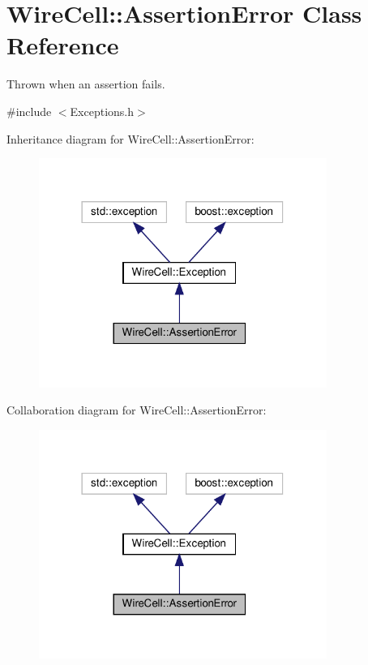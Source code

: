 \hypertarget{class_wire_cell_1_1_assertion_error}{}\section{Wire\+Cell\+:\+:Assertion\+Error Class Reference}
\label{class_wire_cell_1_1_assertion_error}


Thrown when an assertion fails.  




{\ttfamily \#include $<$Exceptions.\+h$>$}



Inheritance diagram for Wire\+Cell\+:\+:Assertion\+Error\+:
\nopagebreak
\begin{figure}[H]
\begin{center}
\leavevmode
\includegraphics[width=266pt]{class_wire_cell_1_1_assertion_error__inherit__graph}
\end{center}
\end{figure}


Collaboration diagram for Wire\+Cell\+:\+:Assertion\+Error\+:
\nopagebreak
\begin{figure}[H]
\begin{center}
\leavevmode
\includegraphics[width=266pt]{class_wire_cell_1_1_assertion_error__coll__graph}
\end{center}
\end{figure}
